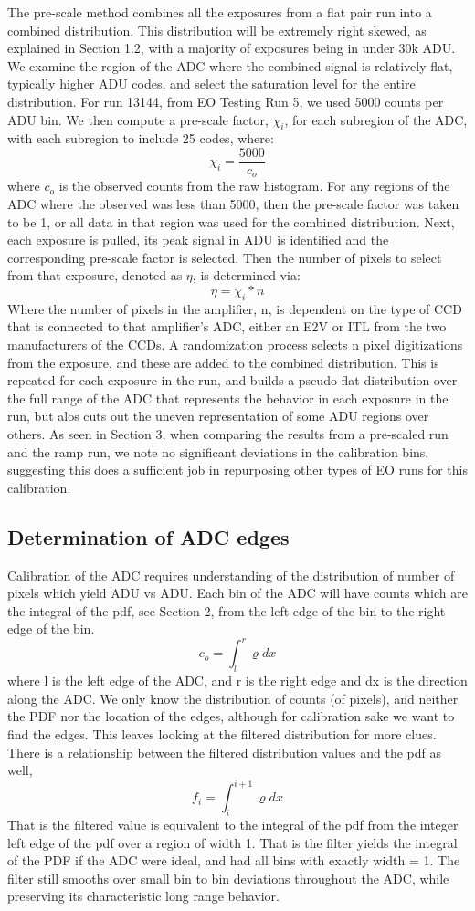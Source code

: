 \documentclass[11pt, letterpaper]{article}
\begin{document}
The pre-scale method combines all the exposures from a flat pair run into a combined distribution. 
This distribution will be extremely right skewed, as explained in Section 1.2, with a majority of exposures being in under 30k ADU. 
We examine the region of the ADC where the combined signal is relatively flat, typically higher ADU codes, and select the saturation level for the entire distribution. For run 13144, from EO Testing Run 5, we used 5000 counts per ADU bin. 
 We then compute a pre-scale factor, $\chi _i$, for each subregion of the ADC, with each subregion to include 25 codes, where:
  \[ \chi_i = \frac{5000}{c_o}\]
where $c_o$ is the observed counts from the raw histogram. For any regions of the ADC where the observed was less than 5000, then the pre-scale factor was taken to be 1, or all data in that region was used for the combined distribution. 
Next, each exposure is pulled, its peak signal in ADU is identified and the corresponding pre-scale factor is selected. 
Then the number of pixels to select from that exposure, denoted as $\eta $, is determined via: 
\[ \eta = \chi_i *n \]
Where the number of pixels in the amplifier, n, is dependent on the type of CCD that is connected to that amplifier's ADC, either an E2V or ITL from the two manufacturers of the CCDs. 
A randomization process selects n pixel digitizations from the exposure, and these are added to the combined distribution. 
This is repeated for each exposure in the run, and builds a pseudo-flat distribution over the full range of the ADC that represents the behavior in each exposure in the run, but alos cuts out the uneven representation of some ADU regions over others. 
As seen in Section 3, when comparing the results from a pre-scaled run and the ramp run, we note no significant deviations in the calibration bins, suggesting this does a sufficient job in repurposing other types of EO runs for this calibration. 

\subsection{Determination of ADC edges} 	
\indent

Calibration of the ADC requires understanding of the distribution of number of pixels which yield ADU vs ADU. 
Each bin of the ADC will have counts which are the integral of the pdf, see Section 2, from the left edge of the bin to the right edge of the bin. 
\[ c_o =  \int_{l}^{r} \varrho dx\]
where l is the left edge of the ADC, and r is the right edge and dx is the direction along the ADC. 
We only know the distribution of counts (of pixels), and neither the PDF nor the location of the edges, although for calibration sake we want to find the edges. 
This leaves looking at the filtered distribution for more clues. 
There is a relationship between the filtered distribution values and the pdf as well,
\[ f_i =  \int_{i}^{i+1} \varrho dx\]
That is the filtered value is equivalent to the integral of the pdf from the integer left edge of the pdf over a region of width 1. 
That is the filter yields the integral of the PDF if the ADC were ideal, and had all bins with exactly width = 1. 
The filter still smooths over small bin to bin deviations throughout the ADC, while preserving its characteristic long range behavior. 
\indent 
\end{document}
